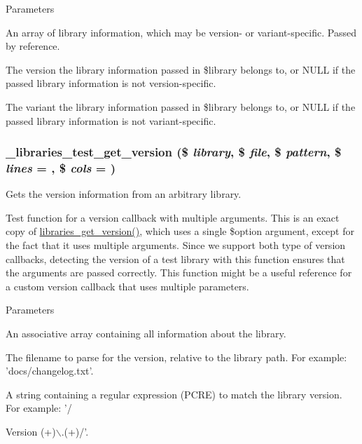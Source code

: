 \begin{DoxyParams}{Parameters}
\item[{\em \$library}]An array of library information, which may be version-\/ or variant-\/specific. Passed by reference. \item[{\em \$version}]The version the library information passed in \$library belongs to, or NULL if the passed library information is not version-\/specific. \item[{\em \$variant}]The variant the library information passed in \$library belongs to, or NULL if the passed library information is not variant-\/specific. \end{DoxyParams}
\hypertarget{libraries__test_8module_a9fca8604e99866a4f25e34093cf89e1b}{
\subsubsection[{\_\-libraries\_\-test\_\-get\_\-version}]{\setlength{\rightskip}{0pt plus 5cm}\_\-libraries\_\-test\_\-get\_\-version (\$ {\em library}, \/  \$ {\em file}, \/  \$ {\em pattern}, \/  \$ {\em lines} = {}, \/  \$ {\em cols} = {})}}
\label{libraries__test_8module_a9fca8604e99866a4f25e34093cf89e1b}
Gets the version information from an arbitrary library.

Test function for a version callback with multiple arguments. This is an exact copy of \hyperlink{libraries_8module_a75db4e86addc3ceb4df8d0e1f5a54f99}{libraries\_\-get\_\-version()}, which uses a single \$option argument, except for the fact that it uses multiple arguments. Since we support both type of version callbacks, detecting the version of a test library with this function ensures that the arguments are passed correctly. This function might be a useful reference for a custom version callback that uses multiple parameters.


\begin{DoxyParams}{Parameters}
\item[{\em \$library}]An associative array containing all information about the library. \item[{\em \$file}]The filename to parse for the version, relative to the library path. For example: 'docs/changelog.txt'. \item[{\em pattern}]A string containing a regular expression (PCRE) to match the library version. For example: '/\end{DoxyParams}
\begin{DoxyVersion}{Version}
(+)$\backslash$.(+)/'. 
\end{DoxyVersion}

